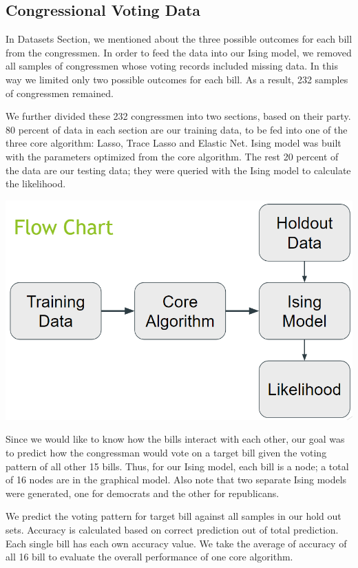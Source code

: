 \documentclass[11pt]{article}
\begin{document}
\subsection{Congressional Voting Data}

In Datasets Section, we mentioned about the three possible outcomes for each bill from the congressmen. In order to feed the data into our Ising model, we removed all samples of congressmen whose voting records included missing data. In this way we limited only two possible outcomes for each bill. As a result,  232 samples of congressmen remained. 

We further divided these 232 congressmen into two sections, based on their party. 80 percent of data in each section are our training data, to be fed into one of the three core algorithm: Lasso, Trace Lasso and Elastic Net. Ising model was built with the parameters optimized from the core algorithm. The rest 20 percent of the data are our testing data; they were queried with the Ising model to calculate the likelihood. 

\includegraphics[scale=0.5]{Control_Flow}

Since we would like to know how the bills interact with each other, our goal was to predict how the congressman would vote on a target bill given the voting pattern of all other 15 bills. Thus, for our Ising model, each bill is a node; a total of 16 nodes are in the graphical model. Also note that two separate Ising models were generated, one for democrats and the other for republicans.

We predict the voting pattern for target bill against all samples in our hold out sets. Accuracy is calculated based on correct prediction out of total prediction. Each single bill has each own accuracy value. We take the average of accuracy of all 16 bill to evaluate the overall performance of one core algorithm. 
\end{document}
